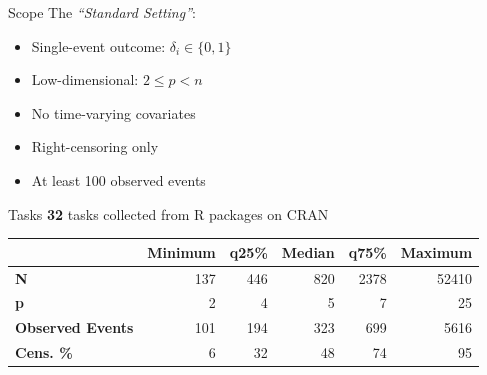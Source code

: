 \documentclass[aspectratio=169,12pt]{beamer}
\providecommand{\tightlist}{%
  \setlength{\itemsep}{2pt}\setlength{\parskip}{0pt}}
\begin{document}
\begin{frame}{Scope}
\label{scope}
The \emph{``Standard Setting''}:

\vspace{1em}

\begin{itemize}
\tightlist
\item
  Single-event outcome: \(\delta_i \in \{0, 1\}\)
\item
  Low-dimensional: \(2 \leq p < n\)
\item
  No time-varying covariates
\item
  Right-censoring only
\item
  At least 100 observed events
\end{itemize}
\end{frame}

\begin{frame}{Tasks}
\label{tasks}
\textbf{32} tasks collected from R packages on CRAN

\begin{table}
\centering
\begin{tabular}[t]{>{}lrrrrr}
\toprule
 & Minimum & q25\% & Median & q75\% & Maximum\\
\midrule
\textbf{N} & 137 & 446 & 820 & 2378 & 52410\\
\textbf{p} & 2 & 4 & 5 & 7 & 25\\
\textbf{Observed Events} & 101 & 194 & 323 & 699 & 5616\\
\textbf{Cens. \%} & 6 & 32 & 48 & 74 & 95\\
\bottomrule
\end{tabular}
\end{table}
\end{frame}

\end{document}
